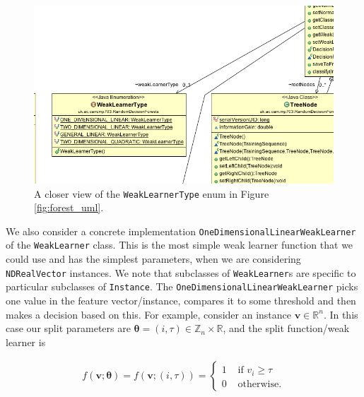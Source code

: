 \documentclass[12pt,twoside,notitlepage]{report}
\newcommand{\vc}[1]{\mathbf{#1}}
\newcommand{\bb}[1]{\mathbb{#1}}
\begin{document}
                \begin{figure}[H]
                    \centering
                    \includegraphics[scale=0.5]{WeakLearnerType_Forest_UML}
                    \caption{A closer view of the \texttt{WeakLearnerType} enum in Figure \ref{fig:forest_uml}.}
                    \label{fig:weak_learner_type_uml}
                \end{figure}

                We also consider a concrete implementation \texttt{OneDimensionalLinearWeakLearner} of the \texttt{WeakLearner}
                class. This is the most simple weak learner function that we could use and has the simplest parameters, 
                when we are considering \texttt{NDRealVector} instances. We note that subclasses of \texttt{WeakLearner}s are
                specific to particular subclasses of \texttt{Instance}. 
                The \texttt{OneDimensionalLinearWeakLearner} picks one value in the feature vector/instance, compares 
                it to some threshold and then makes a decision based on this. For example, consider an 
                instance $\vc{v} \in \bb{R}^n$. In this case our split parameters are $\vc{\theta} = (i,\tau) \in 
                \bb{Z}_n \times \bb{R}$, and the split function/weak learner is

                \begin{align}
                  f(\vc{v}; \vc{\theta}) = f(\vc{v}; (i,\tau)) = \begin{cases}
                    1 & \text{ if } v_i \geq \tau \\
                    0 & \text{ otherwise.}
                  \end{cases}
                  \label{eq:split_equation}
                \end{align}
\end{document}
